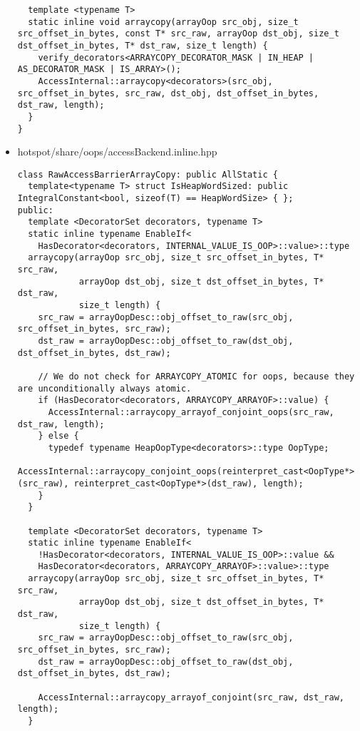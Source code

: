 \begin{itemize}
\begin{verbatim}
  template <typename T>
  static inline void arraycopy(arrayOop src_obj, size_t src_offset_in_bytes, const T* src_raw, arrayOop dst_obj, size_t dst_offset_in_bytes, T* dst_raw, size_t length) {
    verify_decorators<ARRAYCOPY_DECORATOR_MASK | IN_HEAP | AS_DECORATOR_MASK | IS_ARRAY>();
    AccessInternal::arraycopy<decorators>(src_obj, src_offset_in_bytes, src_raw, dst_obj, dst_offset_in_bytes, dst_raw, length);
  }
}
\end{verbatim}

\item hotspot/share/oops/accessBackend.inline.hpp\\
\begin{verbatim}
class RawAccessBarrierArrayCopy: public AllStatic {
  template<typename T> struct IsHeapWordSized: public IntegralConstant<bool, sizeof(T) == HeapWordSize> { };
public:
  template <DecoratorSet decorators, typename T>
  static inline typename EnableIf<
    HasDecorator<decorators, INTERNAL_VALUE_IS_OOP>::value>::type
  arraycopy(arrayOop src_obj, size_t src_offset_in_bytes, T* src_raw,
            arrayOop dst_obj, size_t dst_offset_in_bytes, T* dst_raw,
            size_t length) {
    src_raw = arrayOopDesc::obj_offset_to_raw(src_obj, src_offset_in_bytes, src_raw);
    dst_raw = arrayOopDesc::obj_offset_to_raw(dst_obj, dst_offset_in_bytes, dst_raw);

    // We do not check for ARRAYCOPY_ATOMIC for oops, because they are unconditionally always atomic.
    if (HasDecorator<decorators, ARRAYCOPY_ARRAYOF>::value) {
      AccessInternal::arraycopy_arrayof_conjoint_oops(src_raw, dst_raw, length);
    } else {
      typedef typename HeapOopType<decorators>::type OopType;
      AccessInternal::arraycopy_conjoint_oops(reinterpret_cast<OopType*>(src_raw), reinterpret_cast<OopType*>(dst_raw), length);
    }
  }

  template <DecoratorSet decorators, typename T>
  static inline typename EnableIf<
    !HasDecorator<decorators, INTERNAL_VALUE_IS_OOP>::value &&
    HasDecorator<decorators, ARRAYCOPY_ARRAYOF>::value>::type
  arraycopy(arrayOop src_obj, size_t src_offset_in_bytes, T* src_raw,
            arrayOop dst_obj, size_t dst_offset_in_bytes, T* dst_raw,
            size_t length) {
    src_raw = arrayOopDesc::obj_offset_to_raw(src_obj, src_offset_in_bytes, src_raw);
    dst_raw = arrayOopDesc::obj_offset_to_raw(dst_obj, dst_offset_in_bytes, dst_raw);

    AccessInternal::arraycopy_arrayof_conjoint(src_raw, dst_raw, length);
  }


\end{verbatim}
\end{itemize}
